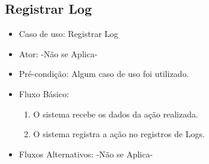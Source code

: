 \documentclass{utfpr-pg}
\begin{document}
    \subsection{Registrar Log} \label{registrarlog}
        \begin{itemize}
        \item Caso de uso: Registrar Log
        \item Ator: -Não se Aplica-
        \item Pré-condição: Algum caso de uso foi utilizado.
        \item Fluxo Básico:
             \begin{enumerate}[label=\textbf{0.\arabic*}]
                \item \label{a01} O sistema recebe os dados da ação realizada.
                \item O sistema registra a ação no registros de Logs.
            \end{enumerate}
        \item Fluxos Alternativos: -Não se Aplica-
        
        \end{itemize}
    
\end{document}
